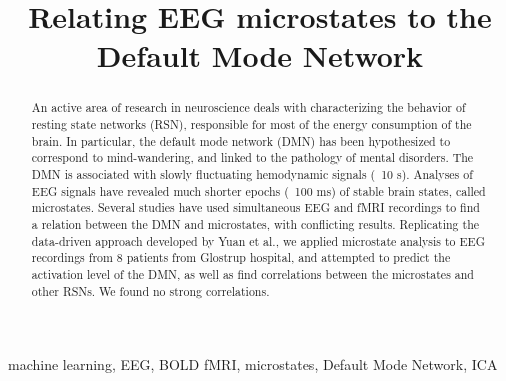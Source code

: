 \documentclass{article}
\title{Relating EEG microstates to the Default Mode Network}
\begin{document}
%

\maketitle
%
\begin{abstract}An active area of research in neuroscience deals with characterizing the behavior of resting state networks (RSN), responsible for most of the energy consumption of the brain. In particular, the default mode network (DMN) has been hypothesized to correspond to mind-wandering, and linked to the pathology of mental disorders. The DMN is associated with slowly fluctuating hemodynamic signals (~10 s). Analyses of EEG signals have revealed much shorter epochs (~100 ms) of stable brain states, called microstates. Several studies have used simultaneous EEG and fMRI recordings to find a relation between the DMN and microstates, with conflicting results. Replicating the data-driven approach developed by Yuan et al., we applied microstate analysis to EEG recordings from 8 patients from Glostrup hospital, and attempted to predict the activation level of the DMN, as well as find correlations between the microstates and other RSNs. We found no strong correlations.

\end{abstract}
%
\begin{keywords}
machine learning, EEG, BOLD fMRI, microstates, Default Mode Network, ICA
\end{keywords}
%
\end{document}
